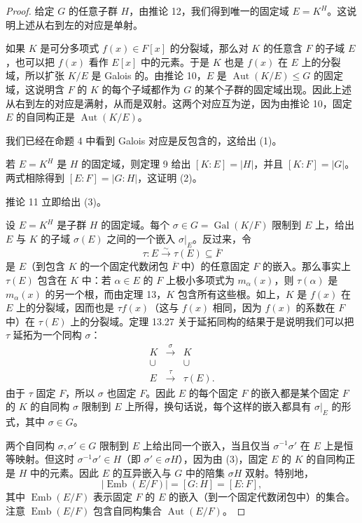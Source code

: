 \begin{proof}
给定 $G$ 的任意子群 $H$，由推论 12，我们得到唯一的固定域 $E=K^H$。这说明上述从右到左的对应是单射。

如果 $K$ 是可分多项式 $f(x)\in F[x]$ 的分裂域，那么对 $K$ 的任意含 $F$ 的子域 $E$，也可以把 $f(x)$ 看作 $E[x]$ 中的元素。于是 $K$ 也是 $f(x)$ 在 $E$ 上的分裂域，所以扩张 $K/E$ 是 Galois 的。由推论 10，$E$ 是 $\operatorname{Aut}(K/E)\leq G$ 的固定域，这说明含 $F$ 的 $K$ 的每个子域都作为 $G$ 的某个子群的固定域出现。因此上述从右到左的对应是满射，从而是双射。这两个对应互为逆，因为由推论 10，固定 $E$ 的自同构正是 $\operatorname{Aut}(K/E)$。

我们已经在命题 4 中看到 Galois 对应是反包含的，这给出 (1)。

若 $E=K^H$ 是 $H$ 的固定域，则定理 9 给出 $[K:E]=|H|$，并且 $[K:F]=|G|$。两式相除得到 $[E:F]=|G:H|$，这证明 (2)。

推论 11 立即给出 (3)。

设 $E=K^H$ 是子群 $H$ 的固定域。每个 $\sigma\in G=\operatorname{Gal}(K/F)$ 限制到 $E$ 上，给出 $E$ 与 $K$ 的子域 $\sigma(E)$ 之间的一个嵌入 $\sigma|_E$。反过来，令
\[
\tau:E\xrightarrow{\sim}\tau(E)\subseteq \overline F
\]
是 $E$（到包含 $K$ 的一个固定代数闭包 $\overline F$ 中）的任意固定 $F$ 的嵌入。那么事实上 $\tau(E)$ 包含在 $K$ 中：若 $\alpha\in E$ 的 $F$ 上极小多项式为 $m_\alpha(x)$，则 $\tau(\alpha)$ 是 $m_\alpha(x)$ 的另一个根，而由定理 13，$K$ 包含所有这些根。如上，$K$ 是 $f(x)$ 在 $E$ 上的分裂域，因而也是 $\tau f(x)$（这与 $f(x)$ 相同，因为 $f(x)$ 的系数在 $F$ 中）在 $\tau(E)$ 上的分裂域。定理 13.27 关于延拓同构的结果于是说明我们可以把 $\tau$ 延拓为一个同构 $\sigma$：
\[
\begin{array}{ccc}
K&\xrightarrow{\sigma}&K\\
\cup&&\cup\\[-1mm]
E&\xrightarrow{\tau}&\tau(E).
\end{array}
\]
由于 $\tau$ 固定 $F$，所以 $\sigma$ 也固定 $F$。因此 $E$ 的每个固定 $F$ 的嵌入都是某个固定 $F$ 的 $K$ 的自同构 $\sigma$ 限制到 $E$ 上所得，换句话说，每个这样的嵌入都具有 $\sigma|_E$ 的形式，其中 $\sigma\in G$。

两个自同构 $\sigma,
\sigma'\in G$ 限制到 $E$ 上给出同一个嵌入，当且仅当 $\sigma^{-1}\sigma'$ 在 $E$ 上是恒等映射。但这时 $\sigma^{-1}\sigma'\in H$（即 $\sigma'\in\sigma H$），因为由 (3)，固定 $E$ 的 $K$ 的自同构正是 $H$ 中的元素。因此 $E$ 的互异嵌入与 $G$ 中的陪集 $\sigma H$ 双射。特别地，
\[
|\operatorname{Emb}(E/F)|=[G:H]=[E:F],
\]
其中 $\operatorname{Emb}(E/F)$ 表示固定 $F$ 的 $E$ 的嵌入（到一个固定代数闭包中）的集合。注意 $\operatorname{Emb}(E/F)$ 包含自同构集合 $\operatorname{Aut}(E/F)$。


\end{proof}
